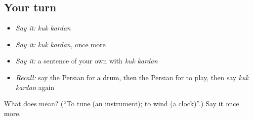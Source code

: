 \subsection*{Your turn}
\begin{itemize}
\raggedright
  \item \emph{Say it:} \emph{kuk kardan}
  \item \emph{Say it:} \emph{kuk kardan}, once more
  \item \emph{Say it:} a sentence of your own with \emph{kuk kardan}
  \item \emph{Recall:} say the Persian for a drum, then the Persian for to play, then say \emph{kuk kardan} again
\end{itemize}

\begin{tcolorbox}[breakable,colback=teal!4,colframe=teal!35!black,title={Before you move on}]
What does   mean? (\textquotedblleft{}To tune (an instrument); to wind (a clock)\textquotedblright{}.) Say it once more.
\end{tcolorbox}
